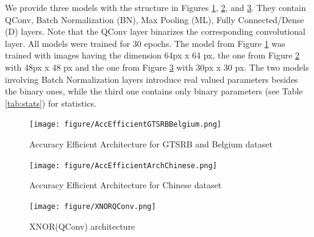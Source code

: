 \documentclass[oneside,11pt,dvipsnames]{book}
\begin{document}
We provide three models with the structure in Figures \ref{fig:Acc-Efficient-Arch-GTSRB-Belgium}, \ref{fig:Acc-Efficient-Arch-Chinese}, and \ref{fig:XNOR(QConv)-arch}. They contain QConv, Batch Normalization (BN), Max Pooling (ML), Fully Connected/Dense (D) layers.  Note that the QConv layer binarizes the corresponding convolutional layer. All models were trained for 30 epochs. The model from Figure \ref{fig:Acc-Efficient-Arch-GTSRB-Belgium} was trained with images having the dimension 64px x 64 px, the one from Figure \ref{fig:Acc-Efficient-Arch-Chinese} with 48px x 48 px and the one from Figure \ref{fig:XNOR(QConv)-arch} with 30px x 30 px. The two models involving Batch Normalization layers introduce real valued parameters besides the binary ones, while the third one contains only binary parameters (see Table \ref{tab:stats}) for statistics.

\begin{figure}[h]
  \centering
    \texttt{[image: figure/AccEfficientGTSRBBelgium.png]}
    \caption{Accuracy Efficient Architecture for GTSRB and Belgium dataset}
    \label{fig:Acc-Efficient-Arch-GTSRB-Belgium}
\end{figure}

\begin{figure}[h]
  \centering
    \texttt{[image: figure/AccEfficientArchChinese.png]}
    \caption{Accuracy Efficient Architecture for Chinese dataset}
    \label{fig:Acc-Efficient-Arch-Chinese}
\end{figure}

\begin{figure}[h]
  \centering
    \texttt{[image: figure/XNORQConv.png]}
    \caption{XNOR(QConv) architecture}
    \label{fig:XNOR(QConv)-arch}
\end{figure}
\end{document}
